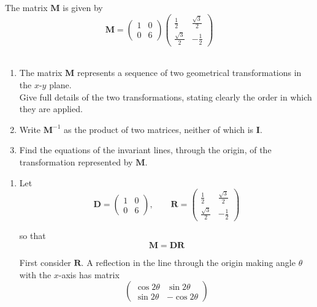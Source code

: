 \documentclass[leqno]{article}
\begin{document}
\begin{enumerate}[
  label=\textbf{\arabic*.},
  leftmargin=*,
  topsep=0pt,
  partopsep=0pt,
  parsep=0pt
]
\newpage

\questionitem

The matrix $\mathbf{M}$ is given by
\[
\mathbf{M} = \begin{pmatrix} 1 & 0 \\[6pt] 0 & 6 \end{pmatrix}\begin{pmatrix} \frac{1}{2} & \frac{\sqrt{3}}{2} \\[6pt] \frac{\sqrt{3}}{2} & -\frac{1}{2} \end{pmatrix}
\] \\
\begin{enumerate}[label=\textbf{(\alph*)}]
  \item The matrix $\mathbf{M}$ represents a sequence of two geometrical transformations in the $x$-$y$ plane. \\
  Give full details of the two transformations, stating clearly the order in which they are applied.  \\
  \item Write $\mathbf{M}^{-1}$ as the product of two matrices, neither of which is $\mathbf{I}$.  \\
  \item Find the equations of the invariant lines, through the origin, of the transformation represented by $\mathbf{M}$.  \\
\end{enumerate}

\vspace*{10pt}

\begin{djsSolution}
\begin{enumerate}[label=\textbf{(\alph*)}]
\item Let
\[
\mathbf{D}=\begin{pmatrix}1&0\\0&6\end{pmatrix},
\qquad
\mathbf{R}=\begin{pmatrix}\frac12&\frac{\sqrt3}{2}\\[4pt]\frac{\sqrt3}{2}&-\frac12\end{pmatrix}
\]

so that
\[
\mathbf{M}=\mathbf{D}\mathbf{R}
\]

First consider \(\mathbf{R}\).  
A reflection in the line through the origin making angle \(\theta\) with the \(x\)-axis has matrix
\[
\begin{pmatrix}
\cos 2\theta & \sin 2\theta\\
\sin 2\theta & -\cos 2\theta
\end{pmatrix}
\]


\end{enumerate}
\end{djsSolution}
\end{enumerate}
\end{document}
